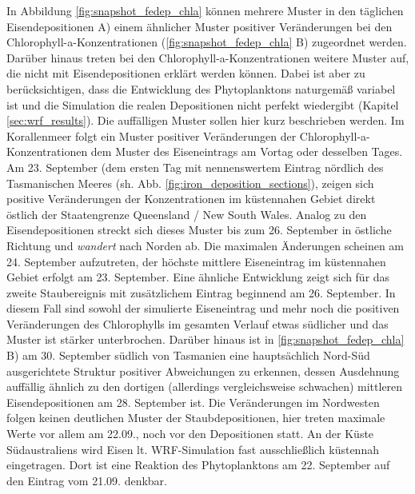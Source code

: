 \documentclass[12pt,a4paper,onecolumn,headheight=30pt]{scrartcl}
\begin{document}
In Abbildung \ref{fig:snapshot_fedep_chla} können mehrere Muster in den täglichen Eisendepositionen A) einem ähnlicher Muster positiver Veränderungen bei den Chlorophyll-a-Konzentrationen (\ref{fig:snapshot_fedep_chla} B) zugeordnet werden. Darüber hinaus treten bei den Chlorophyll-a-Konzentrationen weitere Muster auf, die nicht mit Eisendepositionen erklärt werden können. Dabei ist aber zu berücksichtigen, dass die Entwicklung des Phytoplanktons naturgemäß variabel ist und die Simulation die realen Depositionen nicht perfekt wiedergibt (Kapitel \ref{sec:wrf_results}). Die auffälligen Muster sollen hier kurz beschrieben werden. Im Korallenmeer folgt ein Muster positiver Veränderungen der Chlorophyll-a-Konzentrationen dem Muster des Eiseneintrags am Vortag oder desselben Tages. Am 23. September (dem ersten Tag mit nennenswertem Eintrag nördlich des Tasmanischen Meeres (sh. Abb. \ref{fig:iron_deposition_sections}), zeigen sich positive Veränderungen der Konzentrationen im küstennahen Gebiet direkt östlich der Staatengrenze Queensland / New South Wales. Analog zu den Eisendepositionen streckt sich dieses Muster bis zum 26. September in östliche Richtung und \textit{wandert} nach Norden ab. Die maximalen Änderungen scheinen am 24. September aufzutreten, der höchste mittlere Eiseneintrag im küstennahen Gebiet erfolgt am 23. September. Eine ähnliche Entwicklung zeigt sich für das  zweite Staubereignis mit zusätzlichem Eintrag beginnend am 26. September. In diesem Fall sind sowohl der simulierte Eiseneintrag und mehr noch die positiven Veränderungen des Chlorophylls im gesamten Verlauf etwas südlicher und das Muster ist stärker unterbrochen. Darüber hinaus ist in \ref{fig:snapshot_fedep_chla} B) am 30. September südlich von Tasmanien eine hauptsächlich Nord-Süd ausgerichtete Struktur positiver Abweichungen zu erkennen, dessen Ausdehnung auffällig ähnlich zu den dortigen (allerdings vergleichsweise schwachen) mittleren Eisendepositionen am 28. September ist. Die Veränderungen im Nordwesten folgen keinen deutlichen Muster der Staubdepositionen, hier treten maximale Werte vor allem am 22.09., noch vor den Depositionen statt. An der Küste Südaustraliens wird Eisen lt. WRF-Simulation fast ausschließlich küstennah eingetragen. Dort ist eine Reaktion des Phytoplanktons am 22. September auf den Eintrag vom 21.09. denkbar.   \\
\end{document}
